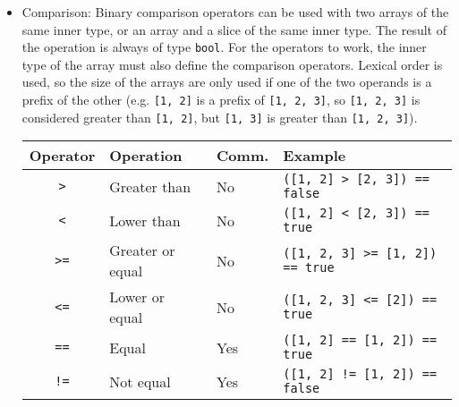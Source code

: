 \begin{itemize}
  The operator \texttt{\~} was chosen to avoid confusion with \texttt{+}, which
  would behave differently depending on the operands.Concatenation is not really
  an arithmetic operation, as \texttt{+} would refer to an addition of all the
  inner values of two arrays, rather than their concatenation. Concatenation
  operator is obviously not commutative.

  \begin{lstlisting}[style=coloredverbatim]
let a : [i32 ; 3] = [1, 2, 3];
let b : [i32 ; 2] = [4, 5];

let c : [i32 ; 5] = a ~ b;

assert (c == [1, 2, 3, 4, 5]);
  \end{lstlisting}

\item Comparison: Binary comparison operators can be used with two arrays of the
  same inner type, or an array and a slice of the same inner type. The result of
  the operation is always of type \texttt{bool}. For the operators to work, the
  inner type of the array must also define the comparison operators. Lexical
  order is used, so the size of the arrays are only used if one of the two operands
  is a prefix of the other (e.g. \texttt{[1, 2]} is a prefix of \texttt{[1, 2,
      3]}, so \texttt{[1, 2, 3]} is considered greater than \texttt{[1, 2]}, but
  \texttt{[1, 3]} is greater than \texttt{[1, 2, 3]}).

  \begin{center}\begin{adjustbox}{max width=1.0\linewidth}
    \begin{tabular}{|c|lll|}
      \hline
      Operator & Operation & Comm. & Example\\
      \hline
      \hline
      \texttt{>}      & Greater than     & No          & \texttt{([1, 2] > [2, 3]) == false}    \\
      \texttt{<}      & Lower than       & No          & \texttt{([1, 2] < [2, 3]) == true}     \\
      \texttt{>=}     & Greater or equal & No          & \texttt{([1, 2, 3] >= [1, 2]) == true} \\
      \texttt{<=}     & Lower or equal   & No          & \texttt{([1, 2, 3] <= [2]) == true}    \\
      \texttt{==}     & Equal            & Yes         & \texttt{([1, 2] == [1, 2]) == true}    \\
      \texttt{!=}     & Not equal        & Yes         & \texttt{([1, 2] != [1, 2]) == false}   \\
      \hline
    \end{tabular}
  \end{adjustbox}\end{center}


\end{itemize}
